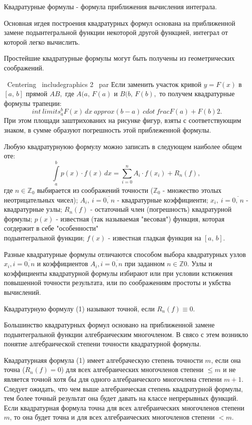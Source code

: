 \documentclass[14pt,a4paper,titlepage]{extarticle}
\begin{document}
Квадратурные формулы - формула приближения вычисления интеграла.

Основная игдея построения квадратурных формул основана на приближенной замене подынтегральной функции некоторой другой функцией, интеграл от которой легко вычислить.

Простейшие квадратурные формулы могут быть получены из геометрических соображений.

{\ Centering \ includegraphics {2} \ par}
Если заменить участок кривой $ y = F (x) $ в $ [a, \, b] $ прямой $ AB, $ где $ A (a, \, F (a) $ и $ B (b, \, F ( b), $ то получем квадратурные формулы трапеции:
$$ \ int \ limits_a ^ b F (x) \, dx \ approx (b-a) \ cdot \ frac {F (a) + F (b)} {2}. $$
При этом площади заштрихованих на рисунке фигур, взяты с соответствующим знаком, в сумме образуют погрешность этой приблеженной формулы.

Любую квадратурнуюю формулу можно записать в следующем наиболее общем оте:
\begin{equation}
\int\limits_a^b p(x)\cdot f(x)\, dx = \sum_{i=0}^n A_i\cdot f(x_i)+R_n(f),
\end{equation}
где $n\in \mathbb{Z}_0$ выбирается из соображений точности ($\mathbb{Z}_0$ - множество этолых неотрицательных чисел); $A_i,\ i=\overline{0,\, n}$ - квадратурные коэффициенти;  $x_i,\ i=\overline{0,\, n}$ - квадратурные узлы; $R_n(f)$ - остаточный член (погрешность) квадратурной формулы; $p(x)$ - известная (так называемая "весовая") функция, которая согдержит в себе "особенности"
\\подынтегральной функции; $f(x)$ - известная гладкая функция на $[a,\, b].$

Разные квадратурные формулы отличаются способом выбора квадратурных узлов $x _ i, i=\overline{0, n}$ и коэффициентов $A _ i, i=\overline{0,n}$ при заданном $n\in \mathbb{Z} 0.$ Узлы и коэффициенты квадратурной формулы избирают или при условии кстижения повышенной точности результата, или по соображениям простоты и укбства вычислений.

Квадратурную формулу (1) называют точной, если $R_n(f)\equiv 0.$


Большинство квадратурных формул основано на приближенной замене подынтегральной функции алгебраическим многочленом. В свясо с этем возникло понятие алгебраической степени точности квадратурной формулы.

Квадратурнаяя формула (1) имеет алгебраческую степень точности $m$, если она точна ($R_n(f)=0$) для всех алгебраических многочленов степени $\leqslant m$ и не является точной хотя бы для одного алгебраического многочлена степени $m+1.$\\
Следует ожидать, что чем выше алгебраическая степень квадратурной формулы, тем
более точный результат она будет давать на классе непрерывных функций. Если квадратурная формула точна для всех алгебраических многочленов степени $m$, то она будет точна и для всех алгебраических многочленов степени $<m.$
\end{document}
